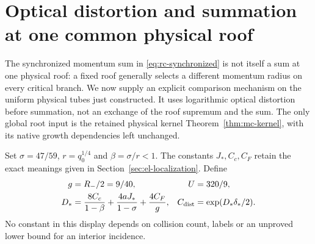 \section{Optical distortion and summation at one common physical roof}
\label{sec:pt-roof}
The synchronized momentum sum in \eqref{eq:rc-synchronized} is not
itself a sum at one physical roof: a fixed roof generally selects a
different momentum radius on every critical branch.  We now supply an
explicit comparison mechanism on the uniform physical tubes just
constructed.  It uses logarithmic optical distortion before summation,
not an exchange of the roof supremum and the sum.  The only global
root input is the retained physical kernel Theorem~\ref{thm:mc-kernel},
with its native growth dependencies left unchanged.

Set $\sigma=47/59$, $r=q_0^{1/4}$ and $\beta=\sigma/r<1$.
The constants $J_*,C_c,C_F$ retain the exact meanings given in
Section~\ref{sec:el-localization}.  Define
\begin{align}
 g&=R_-/2=9/40, &U&=320/9,\notag\\
 D_*&=\frac{8C_c}{1-\beta}
       +\frac{4aJ_*}{1-\sigma}+\frac{4C_F}{g},
 &C_{\rm dist}&=\exp(D_*\delta_*/2).\label{eq:pt-dist-constants}
\end{align}
No constant in this display depends on collision count, labels or
an unproved lower bound for an interior incidence.

